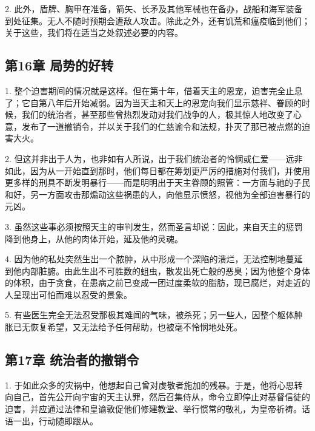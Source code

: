 2. 此外，盾牌、胸甲在准备，箭矢、长矛及其他军械也在备办，战船和海军装备到处征集。无人不随时预期会遭敌人攻击。除此之外，还有饥荒和瘟疫临到他们；关于这些，我们将在适当之处叙述必要的内容。\par


\subsection{第16章 局势的好转}

1. 整个迫害期间的情况就是这样。但在第十年，借着天主的恩宠，迫害完全止息了；它自第八年后开始减弱。因为当天主和天上的恩宠向我们显示慈祥、眷顾的时候，我们的统治者，甚至那些曾热烈发动对我们战争的人，极其惊人地改变了心意，发布了一道撤销令，并以关于我们的仁慈谕令和法规，扑灭了那已被点燃的迫害大火。\par

2. 但这并非出于人为，也非如有人所说，出于我们统治者的怜悯或仁爱——远非如此，因为从一开始直到那时，他们每日都在筹划更严厉的措施对付我们，并使用更多样的刑具不断发明暴行——而是明明出于天主眷顾的照管：一方面与祂的子民和好，另一方面攻击那煽动这些祸患的人，向他显示愤怒，视他为全部迫害暴行的元凶。\par

3. 虽然这些事必须按照天主的审判发生，然而圣言却说：因此，来自天主的惩罚降到他身上，从他的肉体开始，延及他的灵魂。\par

4. 因为他的私处突然生出一个脓肿，从中形成一个深陷的溃烂，无法控制地蔓延到他内部脏腑。由此生出不可胜数的蛆虫，散发出死亡般的恶臭；因为他整个身体的体积，由于贪食，在患病之前已变成一团过度柔软的脂肪，现已腐烂，对走近的人呈现出可怕而难以忍受的景象。\par

5. 有些医生完全无法忍受那极其难闻的气味，被杀死；另一些人，因整个躯体肿胀已无恢复希望，又无法给予任何帮助，也被毫不怜悯地处死。\par


\subsection{第17章 统治者的撤销令}

1. 于如此众多的灾祸中，他想起自己曾对虔敬者施加的残暴。于是，他将心思转向自己，首先公开向宇宙的天主认罪，然后召集侍从，命令立即停止对基督信徒的迫害，并应通过法律和皇谕敦促他们修建教堂、举行惯常的敬礼，为皇帝祈祷。话语一出，行动随即跟从。\par

